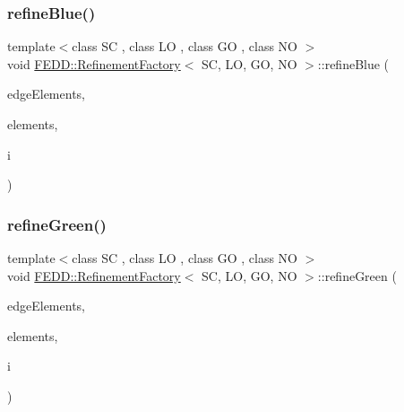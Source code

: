 \mbox{\label{classFEDD_1_1RefinementFactory_aeeebbc6bfb22dfb14470cf628400733a}} 
\subsubsection{\texorpdfstring{refine\+Blue()}{refineBlue()}}
{\footnotesize\ttfamily template$<$class SC , class LO , class GO , class NO $>$ \\
void \hyperlink{classFEDD_1_1RefinementFactory}{F\+E\+D\+D\+::\+Refinement\+Factory}$<$ SC, LO, GO, NO $>$\+::refine\+Blue (\begin{DoxyParamCaption}\item[{\hyperlink{classFEDD_1_1RefinementFactory_ae5285e990ec4632d6188a1280627ad13}{Edge\+Elements\+Ptr\+\_\+\+Type}}]{edge\+Elements,  }\item[{\hyperlink{classFEDD_1_1RefinementFactory_a0994b5b7b6d080048673941251999f2e}{Elements\+Ptr\+\_\+\+Type}}]{elements,  }\item[{int}]{i }\end{DoxyParamCaption})}

\mbox{\label{classFEDD_1_1RefinementFactory_a130f21212d5edaad2dc8f809a2628f2a}} 
\subsubsection{\texorpdfstring{refine\+Green()}{refineGreen()}}
{\footnotesize\ttfamily template$<$class SC , class LO , class GO , class NO $>$ \\
void \hyperlink{classFEDD_1_1RefinementFactory}{F\+E\+D\+D\+::\+Refinement\+Factory}$<$ SC, LO, GO, NO $>$\+::refine\+Green (\begin{DoxyParamCaption}\item[{\hyperlink{classFEDD_1_1RefinementFactory_ae5285e990ec4632d6188a1280627ad13}{Edge\+Elements\+Ptr\+\_\+\+Type}}]{edge\+Elements,  }\item[{\hyperlink{classFEDD_1_1RefinementFactory_a0994b5b7b6d080048673941251999f2e}{Elements\+Ptr\+\_\+\+Type}}]{elements,  }\item[{int}]{i }\end{DoxyParamCaption})}

